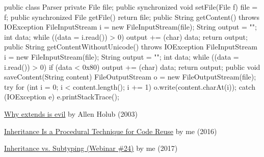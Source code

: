 \documentclass{article}
\begin{document}


\begin{pptWide}{2}
{\scriptsize\begin{ffcode}
public class Parser {
  private File file;
  public synchronized void setFile(File f) {
    file = f;
  }
  public synchronized File getFile() {
    return file;
  }
  public String getContent() throws IOException {
    FileInputStream i = new FileInputStream(file);
    String output = "";
    int data;
    while ((data = i.read()) > 0) {
      output += (char) data;
    }
    return output;
  }
  public String getContentWithoutUnicode()
    throws IOException {
    FileInputStream i = new FileInputStream(file);
    String output = "";
    int data;
    while ((data = i.read()) > 0) {
      if (data < 0x80) {
        output += (char) data;
      }
    }
    return output;
  }
  public void saveContent(String content) {
    FileOutputStream o = new FileOutputStream(file);
    try {
      for (int i = 0; i < content.length(); i += 1) {
        o.write(content.charAt(i));
      }
    } catch (IOException e) {
      e.printStackTrace();
    }
  }
}
\end{ffcode}
}
\end{pptWide}
\plush{}


\href{https://www.infoworld.com/article/2073649/why-extends-is-evil.html}{Why extends is evil} by Allen Holub (2003)

\href{https://www.yegor256.com/2016/09/13/inheritance-is-procedural.html}{Inheritance Is a Procedural Technique for Code Reuse} by me (2016)

\href{https://www.youtube.com/watch?v=DjrA7_Uymok}{Inheritance vs. Subtyping (Webinar \#24)} by me (2017)
\end{document}
